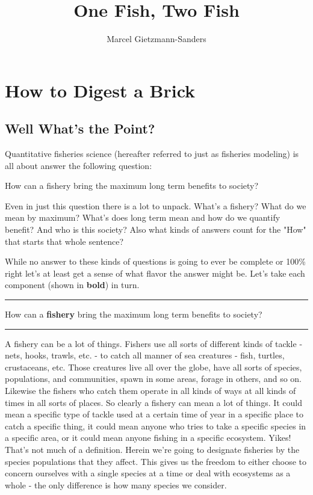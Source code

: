 \documentclass[11pt,a5paper]{book}
\title{One Fish, Two Fish}
\author{Marcel Gietzmann-Sanders}
\date{}
\begin{document}
\maketitle
\tableofcontents
\newpage
\chapter{How to Digest a Brick}

\section{Well What's the Point?}

Quantitative fisheries science (hereafter referred to just as fisheries modeling) is all about answer the following question:
\newline

 \hangindent=1cm \noindent How can a fishery bring the maximum long term benefits to society?
\newline

Even in just this question there is a lot to unpack. What's a fishery? What do we mean by maximum? What's does long term mean and how do we quantify benefit? And who is this society? Also what kinds of answers count for the "How" that starts that whole sentence? 
\newline

While no answer to these kinds of questions is going to ever be complete or 100\% right let's at least get a sense of what flavor the answer might be. Let's take each component (shown in \textbf{bold}) in turn.
\newpage

\noindent \rule{\textwidth}{0.5pt} 
\noindent How can a \textbf{fishery} bring the maximum long term benefits to society?
\newline
\rule{\textwidth}{0.5pt} 
\vspace{5pt}

A fishery can be a lot of things. Fishers use all sorts of different kinds of tackle - nets, hooks, trawls, etc. - to catch all manner of sea creatures - fish, turtles, crustaceans, etc. Those creatures live all over the globe, have all sorts of species, populations, and communities, spawn in some areas, forage in others, and so on. Likewise the fishers who catch them operate in all kinds of ways at all kinds of times in all sorts of places. So clearly a fishery can mean a lot of things. It could mean a specific type of tackle used at a certain time of year in a specific place to catch a specific thing, it could mean anyone who tries to take a specific species in a specific area, or it could mean anyone fishing in a specific ecosystem. Yikes! That's not much of a definition. Herein we're going to designate fisheries by the species populations that they affect. This gives us the freedom to either choose to concern ourselves with a single species at a time or deal with ecosystems as a whole - the only difference is how many species we consider. 
\newpage
\end{document}
